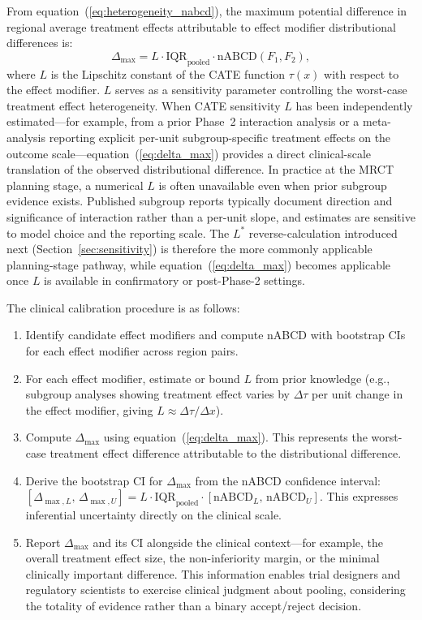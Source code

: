 \documentclass[AMA,Times1COL]{WileyNJDv5}
\begin{document}
From equation~(\ref{eq:heterogeneity_nabcd}), the maximum potential difference in regional average treatment effects attributable to effect modifier distributional differences is:
\begin{equation}
\Delta_{\max} = L \cdot \text{IQR}_{\text{pooled}} \cdot \text{nABCD}(F_1, F_2),
\label{eq:delta_max}
\end{equation}
where $L$ is the Lipschitz constant of the CATE function $\tau(x)$ with respect to the effect modifier. $L$ serves as a sensitivity parameter controlling the worst-case treatment effect heterogeneity. When CATE sensitivity $L$ has been independently estimated---for example, from a prior Phase~2 interaction analysis or a meta-analysis reporting explicit per-unit subgroup-specific treatment effects on the outcome scale---equation~(\ref{eq:delta_max}) provides a direct clinical-scale translation of the observed distributional difference. In practice at the MRCT planning stage, a numerical $L$ is often unavailable even when prior subgroup evidence exists. Published subgroup reports typically document direction and significance of interaction rather than a per-unit slope, and estimates are sensitive to model choice and the reporting scale. The $L^*$ reverse-calculation introduced next (Section~\ref{sec:sensitivity}) is therefore the more commonly applicable planning-stage pathway, while equation~(\ref{eq:delta_max}) becomes applicable once $L$ is available in confirmatory or post-Phase-2 settings.

The clinical calibration procedure is as follows:
\begin{enumerate}[1.]
\item Identify candidate effect modifiers and compute nABCD with bootstrap CIs for each effect modifier across region pairs.
\item For each effect modifier, estimate or bound $L$ from prior knowledge (e.g., subgroup analyses showing treatment effect varies by $\Delta\tau$ per unit change in the effect modifier, giving $L \approx \Delta\tau / \Delta x$).
\item Compute $\Delta_{\max}$ using equation~(\ref{eq:delta_max}). This represents the worst-case treatment effect difference attributable to the distributional difference.
\item Derive the bootstrap CI for $\Delta_{\max}$ from the nABCD confidence interval: $[\Delta_{\max,L},\, \Delta_{\max,U}] = L \cdot \text{IQR}_{\text{pooled}} \cdot [\text{nABCD}_{L},\, \text{nABCD}_{U}]$. This expresses inferential uncertainty directly on the clinical scale.
\item Report $\Delta_{\max}$ and its CI alongside the clinical context---for example, the overall treatment effect size, the non-inferiority margin, or the minimal clinically important difference. This information enables trial designers and regulatory scientists to exercise clinical judgment about pooling, considering the totality of evidence rather than a binary accept/reject decision.
\end{enumerate}
\end{document}
